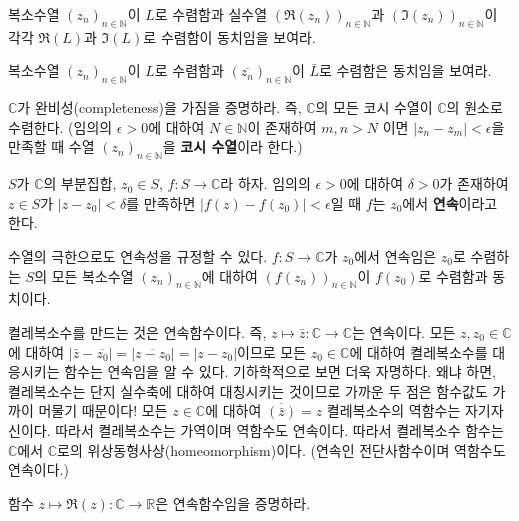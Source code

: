 \begin{salt_exercise} \label{ex-1-25}
복소수열 $(z_n)_{n\in\mathbb N}$이 $L$로 수렴함과
실수열 $(\Re(z_n))_{n\in\mathbb N}$과  $(\Im(z_n))_{n\in\mathbb N}$이
각각 $\Re(L)$과 $\Im(L)$로 수렴함이 동치임을 보여라.
\end{salt_exercise}

\begin{salt_exercise} \label{ex-1-26}
복소수열 $(z_n)_{n\in\mathbb N}$이 $L$로 수렴함과
$(\overline{z_n})_{n\in\mathbb N}$이 $\bar L$로 수렴함은 동치임을 보여라.
\end{salt_exercise}

\begin{salt_exercise} \label{ex-1-27}
$\mathbb C$가 완비성(completeness)을 가짐을 증명하라.
즉, $\mathbb C$의 모든 코시 수열이 $\mathbb C$의 원소로 수렴한다.
(임의의 $\epsilon>0$에 대하여  $N\in\mathbb N$이 존재하여
$m,n>N$ 이면 $|z_n - z_m| < \epsilon$을 만족할 때
수열 $(z_n)_{n\in\mathbb N}$을 {\bf 코시 수열}이라 한다.)
\end{salt_exercise}

$S$가 $\mathbb C$의 부분집합, $z_0\in S$,  $f:S\to \mathbb C$라 하자.
임의의 $\epsilon>0$에 대하여 $\delta>0$가 존재하여
$z\in S$가 $|z-z_0|<\delta$를 만족하면 $|f(z)-f(z_0)|<\epsilon$일 때
$f$는 $z_0$에서 {\bf 연속}이라고 한다.

수열의 극한으로도 연속성을 규정할 수 있다.
$f:S\to\mathbb C$가 $z_0$에서 연속임은
$z_0$로 수렴하는 $S$의 모든 복소수열 $(z_n)_{n\in\mathbb N}$에 대하여
$(f(z_n))_{n\in\mathbb N}$이 $f(z_0)$로 수렴함과 동치이다.

\begin{saltexample}[label=example-1-2] {}{}
켤레복소수를 만드는 것은 연속함수이다.
즉, $z\mapsto\bar z: \mathbb C \to \mathbb C$는 연속이다.
모든 $z, z_0 \in \mathbb C$에 대하여
$|\bar z - \overline{z_0}| = |\overline{z-z_0}| = |z-z_0|$이므로
모든 $z_0\in\mathbb C$에 대하여 켤레복소수를 대응시키는 함수는
연속임을 알 수 있다.
 기하학적으로 보면 더욱 자명하다. 왜냐 하면, 켤레복소수는 단지 실수축에 대하여 
대칭시키는 것이므로 가까운 두 점은 함수값도 가까이 머물기 때문이다!
\saltvskipex
모든 $z\in\mathbb C$에 대하여 $\overline{(\bar z)} = z$ 켤레복소수의
역함수는 자기자신이다. 따라서 켤레복소수는 가역이며 역함수도 연속이다.
따라서 켤레복소수 함수는 $\mathbb C$에서 $\mathbb C$로의 
위상동형사상(homeomorphism)이다. (연속인 전단사함수이며 역함수도 연속이다.)
\end{saltexample}

\begin{salt_exercise} \label{ex-1-28}
함수 $z\mapsto \Re(z): \mathbb C \to \mathbb R$은 연속함수임을 증명하라. 
\end{salt_exercise}

